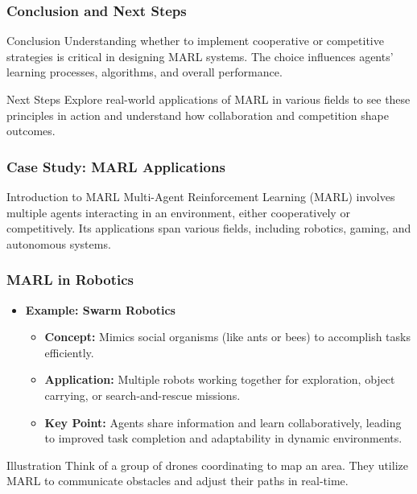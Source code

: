 \documentclass[aspectratio=169]{beamer}
\begin{document}
\begin{frame}[fragile]
    \frametitle{Conclusion and Next Steps}
    \begin{block}{Conclusion}
        Understanding whether to implement cooperative or competitive strategies is critical in designing MARL systems. 
        The choice influences agents' learning processes, algorithms, and overall performance.
    \end{block}
    \begin{block}{Next Steps}
        Explore real-world applications of MARL in various fields to see these principles in action and understand how collaboration and competition shape outcomes.
    \end{block}
\end{frame}

\begin{frame}[fragile]
    \frametitle{Case Study: MARL Applications}
    \begin{block}{Introduction to MARL}
        Multi-Agent Reinforcement Learning (MARL) involves multiple agents interacting in an environment, either cooperatively or competitively. Its applications span various fields, including robotics, gaming, and autonomous systems.
    \end{block}
\end{frame}

\begin{frame}[fragile]
    \frametitle{MARL in Robotics}
    \begin{itemize}
        \item \textbf{Example: Swarm Robotics}
        \begin{itemize}
            \item \textbf{Concept:} Mimics social organisms (like ants or bees) to accomplish tasks efficiently.
            \item \textbf{Application:} Multiple robots working together for exploration, object carrying, or search-and-rescue missions.
            \item \textbf{Key Point:} Agents share information and learn collaboratively, leading to improved task completion and adaptability in dynamic environments.
        \end{itemize}
    \end{itemize}
    \begin{block}{Illustration}
        Think of a group of drones coordinating to map an area. They utilize MARL to communicate obstacles and adjust their paths in real-time.
    \end{block}
\end{frame}
\end{document}
